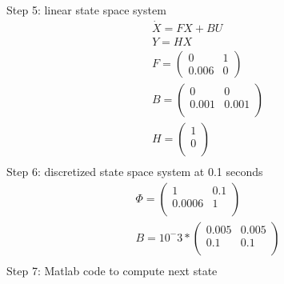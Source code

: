 \documentclass[11pt]{article}
\begin{document}
Step 5: linear state space system
\begin{equation}
\begin{array}{l}
\dot{X} = FX + BU\\
Y = HX\\
F = 
\begin{pmatrix}
0 & 1\\
0.006 & 0
\end{pmatrix}\\
B = 
\begin{pmatrix}
0 & 0\\
0.001 & 0.001\\
\end{pmatrix}\\
H = 
\begin{pmatrix}
1 \\
0\\
\end{pmatrix}\\
\end{array}
\end{equation}
Step 6: discretized state space system at 0.1 seconds
\begin{equation}
\begin{array}{l}
\Phi=
\begin{pmatrix}
1 & 0.1\\
0.0006 & 1\\
\end{pmatrix}\\ 
B = 10^-3*
\begin{pmatrix}
0.005 & 0.005\\
0.1 & 0.1\\
\end{pmatrix}\\
\end{array}
\end{equation}
Step 7: Matlab code to compute next state

        
\end{document}
